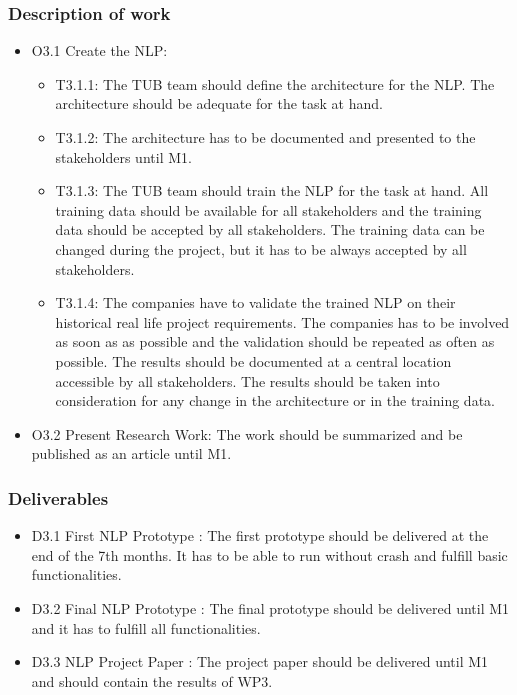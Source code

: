 \subsubsection{Description of work}
\begin{itemize}
	\item O3.1 Create the \gls{NLP}:
	\begin{itemize}
		\item T3.1.1: The \gls{TUB} team should define the architecture for the \gls{NLP}. The architecture should be adequate for the task at hand.
		\item T3.1.2: The architecture has to be documented and presented to the stakeholders until M1.
		\item T3.1.3: The \gls{TUB} team should train the \gls{NLP} for the task at hand. All training data should be available for all stakeholders and the training data should be accepted by all stakeholders. The training data can be changed during the project, but it has to be always accepted by all stakeholders.
		\item T3.1.4: The companies have to validate the trained \gls{NLP} on their historical real life project requirements. The companies has to be involved as soon as as possible and the validation should be repeated as often as possible. The results should be documented at a central location accessible by all stakeholders. The results should be taken into consideration for any change in the architecture or in the training data.  
	\end{itemize}
	\item O3.2 Present Research Work: The work should be summarized and be published as an article until M1. 
\end{itemize}
\subsubsection{Deliverables}
\begin{itemize}
	\item D3.1 First \gls{NLP} Prototype : The first prototype should be delivered at the end of the 7th months. It has to be able to run without crash and fulfill basic functionalities.
	\item D3.2 Final \gls{NLP} Prototype : The final prototype should be delivered until M1 and it has to fulfill all functionalities.
	\item D3.3 \gls{NLP} Project Paper : The project paper should be delivered until M1 and should contain the results of WP3.
\end{itemize}